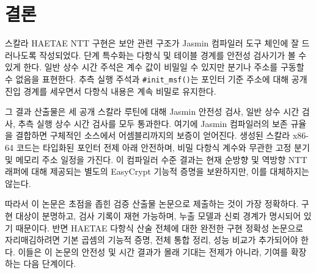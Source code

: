 \documentclass[10pt,twocolumn]{article}
\newcommand{\haetae}{HAETAE}
\newcommand{\jasmin}{Jasmin}
\newcommand{\ct}{상수 시간}
\newcommand{\sct}{추측 실행 상수 시간}
\begin{document}
\section{결론}

스칼라 \haetae{} NTT 구현은 보안 관련 구조가 \jasmin{} 컴파일러 도구
체인에 잘 드러나도록 작성되었다. 단계 특수화는 다항식 및 테이블 경계를
안전성 검사기가 볼 수 있게 한다. 일반 \ct{} 주석은 계수 값이 비밀일 수
있지만 분기나 주소를 구동할 수 없음을 표현한다. 추측 실행 주석과
\texttt{\#init\_msf()}는 포인터 기준 주소에 대해 공개 진입 경계를
세우면서 다항식 내용은 계속 비밀로 유지한다.

그 결과 산출물은 세 공개 스칼라 루틴에 대해 \jasmin{} 안전성 검사,
일반 \ct{} 검사, \sct{} 검사를 모두 통과한다. 여기에 \jasmin{}
컴파일러의 보존 규율을 결합하면 구체적인 소스에서 어셈블리까지의
보증이 얻어진다. 생성된 스칼라 x86-64 코드는 타입화된 포인터 전제
아래 안전하며, 비밀 다항식 계수와 무관한 고정 분기 및 메모리 주소
일정을 가진다. 이 컴파일러 수준 결과는 현재 순방향 및 역방향 NTT
래퍼에 대해 제공되는 별도의 EasyCrypt 기능적 증명을 보완하지만, 이를
대체하지는 않는다.

따라서 이 논문은 초점을 좁힌 검증 산출물 논문으로 제출하는 것이 가장
정확하다. 구현 대상이 분명하고, 검사 기록이 재현 가능하며, 누출 모델과
신뢰 경계가 명시되어 있기 때문이다. 반면 HAETAE 다항식 산술 전체에
대한 완전한 구현 정확성 논문으로 자리매김하려면 기본 곱셈의 기능적
증명, 전체 통합 정리, 성능 비교가 추가되어야 한다. 이들은 이 논문의
안전성 및 시간 결과가 몰래 기대는 전제가 아니라, 기여를 확장하는 다음
단계이다.



\end{document}
